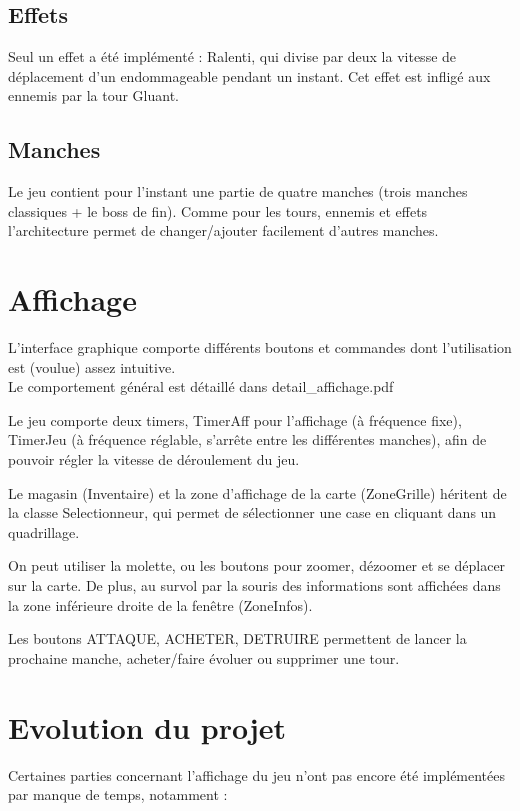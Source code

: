 \documentclass{article}
\begin{document}
\subsection{Effets}

Seul un effet a été implémenté : Ralenti, qui divise par deux la vitesse de déplacement d'un endommageable pendant un instant.
Cet effet est infligé aux ennemis par la tour Gluant.

\subsection{Manches}

Le jeu contient pour l'instant une partie de quatre manches (trois manches classiques + le boss de fin).
Comme pour les tours, ennemis et effets l'architecture permet de changer/ajouter facilement d'autres manches.

\section{Affichage}

L'interface graphique comporte différents boutons et commandes dont l'utilisation est (voulue) assez intuitive.\\
Le comportement général est détaillé dans detail\_affichage.pdf

Le jeu comporte deux timers, TimerAff pour l'affichage (à fréquence fixe), TimerJeu (à fréquence réglable, s'arrête entre les différentes manches), afin de pouvoir régler la vitesse de déroulement du jeu.

Le magasin (Inventaire) et la zone d'affichage de la carte (ZoneGrille) héritent de la classe Selectionneur, qui permet de sélectionner une case en cliquant dans un quadrillage.

On peut utiliser la molette, ou les boutons pour zoomer, dézoomer et se déplacer sur la carte. De plus, au survol par la souris des informations sont affichées dans la zone inférieure droite de la fenêtre (ZoneInfos).

Les boutons ATTAQUE, ACHETER, DETRUIRE permettent de lancer la prochaine manche, acheter/faire évoluer ou supprimer une tour.


\section{Evolution du projet}

Certaines parties concernant l'affichage du jeu n'ont pas encore été implémentées par manque de temps, notamment :
\end{document}

